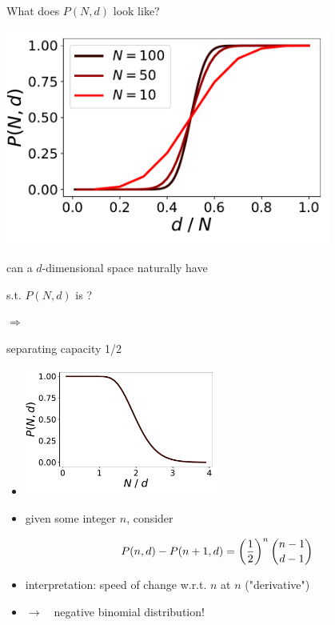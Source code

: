 \documentclass[aspectratio=169, 11pt, handout]{beamer}
\begin{document}
\begin{frame}{What does $P(N, d)$ look like?}
 \begin{center}
   \includegraphics[width=0.8\textwidth]{images/pnd}
 \end{center}
\end{frame}

\begin{frame}{}
  \begin{center}
    {\large
       can a $d$-dimensional space naturally have

      s.t. $P(N, d)$ is ?

    \bigskip
    
    $\Rightarrow$ 
  }
  \end{center}
\end{frame}

\begin{frame}{separating capacity 1/2}  
  \begin{itemize}
  \item[] {
      \begin{center}
        \includegraphics[width=0.5\textwidth]{images/pnd-n}
      \end{center}
    }\pause    
  \item {
      given some integer $n$, consider 
      
      \[
        P(n, d) - P(n+1, d) = \left(\frac{1}{2}\right)^{n} {n-1 \choose d-1}
      \]
    }
  \item \pause interpretation: speed of change w.r.t. $n$ at $n$ ("derivative")
  \item \pause$\rightarrow\quad$negative binomial distribution!
  \end{itemize}
\end{frame}
	
\end{document}
